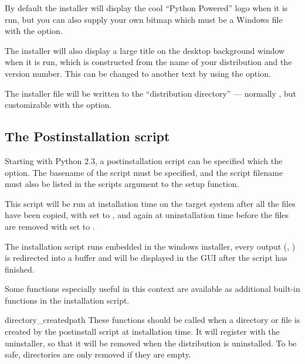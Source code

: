 \documentclass{manual}
\begin{document}
By default the installer will display the cool ``Python Powered'' logo
when it is run, but you can also supply your own bitmap which must be
a Windows  file with the  option.

The installer will also display a large title on the desktop
background window when it is run, which is constructed from the name
of your distribution and the version number.  This can be changed to
another text by using the  option.

The installer file will be written to the ``distribution directory''
--- normally , but customizable with the
 option.

\subsection{The Postinstallation script}
\label{postinstallation-script}

Starting with Python 2.3, a postinstallation script can be specified
which the  option.  The basename of the
script must be specified, and the script filename must also be listed
in the scripts argument to the setup function.

This script will be run at installation time on the target system
after all the files have been copied, with  set to
, and again at uninstallation time before the
files are removed with  set to .

The installation script runs embedded in the windows installer, every
output (, ) is redirected into a
buffer and will be displayed in the GUI after the script has finished.

Some functions especially useful in this context are available as
additional built-in functions in the installation script.

\begin{funcdesc}{directory_created}{path}
  These functions should be called when a directory or file is created
  by the postinstall script at installation time.  It will register
   with the uninstaller, so that it will be removed when the
  distribution is uninstalled.  To be safe, directories are only removed
  if they are empty.
\end{funcdesc}
\end{document}
